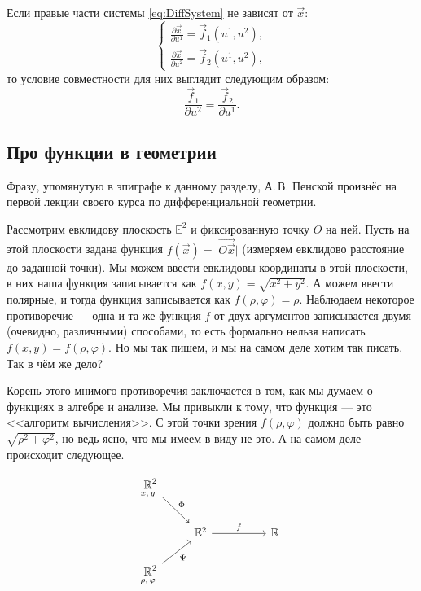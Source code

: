 \begin{example} \label{example:SimpleDiffJointness}
	Если правые части системы \eqref{eq:DiffSystem} не зависят от $\vec{x}$:
	\[
		\begin{cases}
			\frac{\partial\vec{x}}{\partial u^1} = \vec{f}_1(u^1, u^2),\\
			\frac{\partial\vec{x}}{\partial u^2} = \vec{f}_2(u^1, u^2),
		\end{cases}
	\]
	то условие совместности для них выглядит следующим образом:
	\[
		\frac{\vec{f}_1}{\partial u^2} = \frac{\vec{f}_2}{\partial u^1}.
	\]
\end{example}

\subsection{Про функции в геометрии}

Фразу, упомянутую в эпиграфе к данному разделу, А.\,В. Пенской произнёс на первой лекции своего курса по дифференциальной геометрии.

Рассмотрим евклидову плоскость\footnotemark{} $\mathbb{E}^2$ и фиксированную точку $O$ на ней. Пусть на этой плоскости задана функция $f(\vec{x}) = \big|\overrightarrow{O\vec{x}}\big|$ (измеряем евклидово расстояние до заданной точки). Мы можем ввести евклидовы координаты в этой плоскости, в них наша функция записывается как $f(x, y) = \sqrt{x^2 + y^2}$. А можем ввести полярные, и тогда функция записывается как $f(\rho, \varphi) = \rho$. Наблюдаем некоторое противоречие --- одна и та же функция $f$ от двух аргументов записывается двумя (очевидно, различными) способами, то есть формально нельзя написать $f(x, y) = f(\rho, \varphi)$. Но мы так пишем, и мы на самом деле хотим так писать. Так в чём же дело?


Корень этого мнимого противоречия заключается в том, как мы думаем о функциях в алгебре и анализе. Мы привыкли к тому, что функция --- это <<алгоритм вычисления>>. С этой точки зрения $f(\rho, \varphi)$ должно быть равно $\sqrt{\rho^2 + \varphi^2}$, но ведь ясно, что мы имеем в виду не это. А на самом деле происходит следующее.

%
\[\begin{tikzcd}
	{\underset{\mathclap{x,\,y}}{\mathbb{R}}^2} \\
	& {\mathbb{E}^2} && {\mathbb{R}} \\
	{\underset{\mathclap{\rho,\,\varphi}}{\mathbb{R}}^2}
	\arrow["\Phi", from=1-1, to=2-2]
	\arrow["f", from=2-2, to=2-4]
	\arrow["\Psi"', from=3-1, to=2-2]
\end{tikzcd}\]
%

